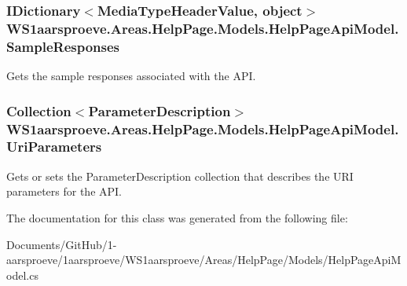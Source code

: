 \subsubsection[{Sample\+Responses}]{\setlength{\rightskip}{0pt plus 5cm}I\+Dictionary$<$Media\+Type\+Header\+Value, object$>$ W\+S1aarsproeve.\+Areas.\+Help\+Page.\+Models.\+Help\+Page\+Api\+Model.\+Sample\+Responses\hspace{0.3cm}{\ttfamily [get]}}\label{class_w_s1aarsproeve_1_1_areas_1_1_help_page_1_1_models_1_1_help_page_api_model_a00adb9ee5ab5d9a8a004fba8e6b8bf4d}


Gets the sample responses associated with the A\+P\+I. 

\hypertarget{class_w_s1aarsproeve_1_1_areas_1_1_help_page_1_1_models_1_1_help_page_api_model_adf89274591dc9d880d387f01a31b108b}{}
\subsubsection[{Uri\+Parameters}]{\setlength{\rightskip}{0pt plus 5cm}Collection$<${\bf Parameter\+Description}$>$ W\+S1aarsproeve.\+Areas.\+Help\+Page.\+Models.\+Help\+Page\+Api\+Model.\+Uri\+Parameters\hspace{0.3cm}{\ttfamily [get]}}\label{class_w_s1aarsproeve_1_1_areas_1_1_help_page_1_1_models_1_1_help_page_api_model_adf89274591dc9d880d387f01a31b108b}


Gets or sets the Parameter\+Description collection that describes the U\+R\+I parameters for the A\+P\+I. 



The documentation for this class was generated from the following file\+:\begin{DoxyCompactItemize}
\item 
Documents/\+Git\+Hub/1-\/aarsproeve/1aarsproeve/\+W\+S1aarsproeve/\+Areas/\+Help\+Page/\+Models/Help\+Page\+Api\+Model.\+cs\end{DoxyCompactItemize}

